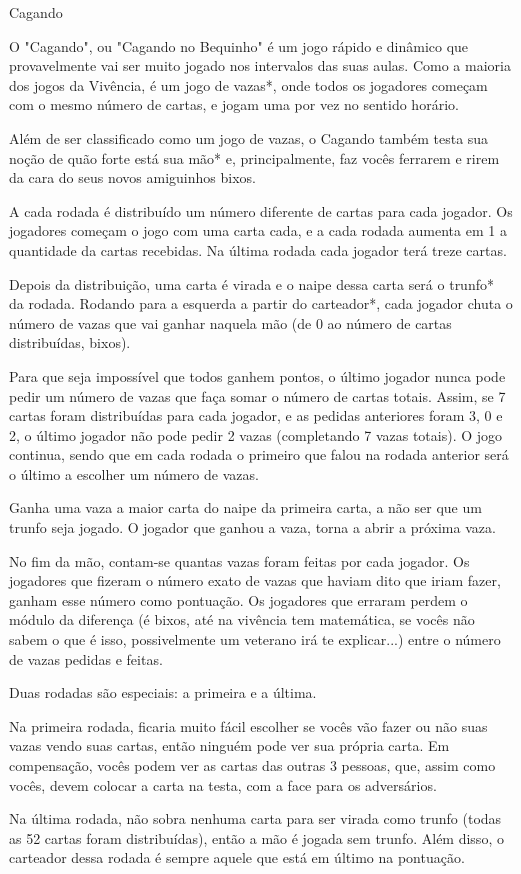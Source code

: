 \begin{subsecao}{Cagando}

O "Cagando", ou "Cagando no Bequinho" é um jogo rápido e dinâmico que
provavelmente vai ser muito jogado nos intervalos das suas aulas. Como a maioria
dos jogos da Vivência, é um jogo de vazas*, onde todos os jogadores começam com
o mesmo número de cartas, e jogam uma por vez no sentido horário.

Além de ser classificado como um jogo de vazas, o Cagando também testa sua noção
de quão forte está sua mão* e, principalmente, faz vocês ferrarem e rirem da
cara do seus novos amiguinhos bixos.

A cada rodada é distribuído um número diferente de cartas para cada jogador. Os
jogadores começam o jogo com uma carta cada, e a cada rodada aumenta em 1 a
quantidade da cartas recebidas. Na última rodada cada jogador terá treze cartas.

Depois da distribuição, uma carta é virada e o naipe dessa carta será o trunfo*
da rodada. Rodando para a esquerda a partir do carteador*, cada jogador chuta o
número de vazas que vai ganhar naquela mão (de 0 ao número de cartas
distribuídas, bixos).

Para que seja impossível que todos ganhem pontos, o último jogador nunca pode
pedir um número de vazas que faça somar o número de cartas totais. Assim, se 7
cartas foram distribuídas para cada jogador, e as pedidas anteriores foram 3, 0
e 2, o último jogador não pode pedir 2 vazas (completando 7 vazas totais). O
jogo continua, sendo que em cada rodada o primeiro que falou na rodada anterior
será o último a escolher um número de vazas. 

Ganha uma vaza a maior carta do naipe da primeira carta, a não ser que um
trunfo seja jogado. O jogador que ganhou a vaza, torna a abrir a próxima vaza. 

No fim da mão, contam-se quantas vazas foram feitas por cada
jogador. Os jogadores que fizeram o número exato de vazas que haviam
dito que iriam fazer, ganham esse número como pontuação. Os jogadores
que erraram perdem o módulo da diferença (é bixos, até na vivência tem
matemática, se vocês não sabem o que é isso, possivelmente um veterano
irá te explicar...) entre o número de vazas pedidas e feitas.

Duas rodadas são especiais: a primeira e a última. 

Na primeira rodada, ficaria muito fácil escolher se vocês vão fazer ou não suas
vazas vendo suas cartas, então ninguém pode ver sua própria carta. Em
compensação, vocês podem ver as cartas das outras 3 pessoas, que, assim como
vocês, devem colocar a carta na testa, com a face para os adversários.

Na última rodada, não sobra nenhuma carta para ser virada como trunfo (todas
as 52 cartas foram distribuídas), então a mão é jogada sem trunfo. Além disso,
o carteador dessa rodada é sempre aquele que está em último na pontuação.

\end{subsecao}
